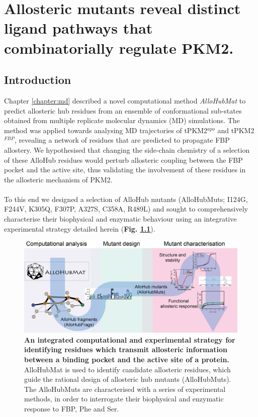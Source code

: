 \chapter{Allosteric mutants reveal distinct ligand pathways that combinatorially regulate PKM2.}
\label{chapter:allohubmut}

\section{Introduction}
Chapter \ref{chapter:md} described a novel computational method \textit{AlloHubMat} to predict allosteric hub residues from an ensemble of conformational sub-states obtained from multiple replicate molecular dynamics (MD) simulations. The method was applied towards analysing MD trajectories of tPKM2$^{apo}$ and tPKM2$^{FBP}$, revealing a network of residues that are predicted to propagate FBP allostery. We hypothesised that changing the side-chain chemistry of a selection of these AlloHub residues would perturb allosteric coupling between the FBP pocket and the active site, thus validating the involvement of these residues in the allosteric mechanism of PKM2. 
%
%
\\\\
%
%
To this end we designed a selection of AlloHub mutants (AlloHubMuts; I124G, F244V, K305Q, F307P, A327S, C358A, R489L) and sought to comprehensively characterise their biophysical and enzymatic behaviour using an integrative experimental strategy detailed herein (\textbf{Fig. \ref{fig:schmatic}}).
%
%
%
\begin{figure}[!ht]
\includegraphics[scale=0.75]{ch7_fig1_schematic.png}
\caption[An integrated computational and experimental strategy for identifying residues which transmit allosteric information between a binding pocket and the active site of a protein. ] {\textbf{An integrated computational and experimental strategy for identifying residues which transmit allosteric information between a binding pocket and the active site of a protein.} AlloHubMat is used to identify candidate allosteric residues, which guide the rational design of allosteric hub mutants (AlloHubMuts). The AlloHubMuts are characterised with a series of experimental methods, in order to interrogate their biophysical and enzymatic response to FBP, Phe and Ser.}
\label{fig:schmatic}
\end{figure}
%
%

